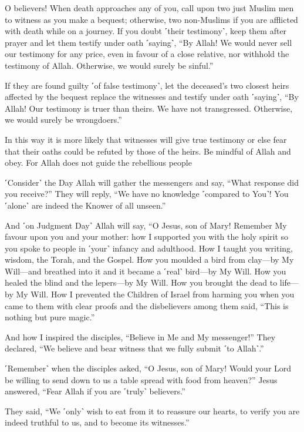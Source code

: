 O believers! When death approaches any of you, call upon two just Muslim men to witness as you make a bequest; otherwise, two non-Muslims if you are afflicted with death while on a journey. If you doubt ˹their testimony˺, keep them after prayer and let them testify under oath ˹saying˺, “By Allah! We would never sell our testimony for any price, even in favour of a close relative, nor withhold the testimony of Allah. Otherwise, we would surely be sinful.”

If they are found guilty ˹of false testimony˺, let the deceased’s two closest heirs affected by the bequest replace the witnesses and testify under oath ˹saying˺, “By Allah! Our testimony is truer than theirs. We have not transgressed. Otherwise, we would surely be wrongdoers.”

In this way it is more likely that witnesses will give true testimony or else fear that their oaths could be refuted by those of the heirs. Be mindful of Allah and obey. For Allah does not guide the rebellious people

˹Consider˺ the Day Allah will gather the messengers and say, “What response did you receive?” They will reply, “We have no knowledge ˹compared to You˺! You ˹alone˺ are indeed the Knower of all unseen.”

And ˹on Judgment Day˺ Allah will say, “O Jesus, son of Mary! Remember My favour upon you and your mother: how I supported you with the holy spirit so you spoke to people in ˹your˺ infancy and adulthood. How I taught you writing, wisdom, the Torah, and the Gospel. How you moulded a bird from clay—by My Will—and breathed into it and it became a ˹real˺ bird—by My Will. How you healed the blind and the lepers—by My Will. How you brought the dead to life—by My Will. How I prevented the Children of Israel from harming you when you came to them with clear proofs and the disbelievers among them said, “This is nothing but pure magic.”

And how I inspired the disciples, “Believe in Me and My messenger!” They declared, “We believe and bear witness that we fully submit ˹to Allah˺.”

˹Remember˺ when the disciples asked, “O Jesus, son of Mary! Would your Lord be willing to send down to us a table spread with food from heaven?” Jesus answered, “Fear Allah if you are ˹truly˺ believers.”

They said, “We ˹only˺ wish to eat from it to reassure our hearts, to verify you are indeed truthful to us, and to become its witnesses.”

